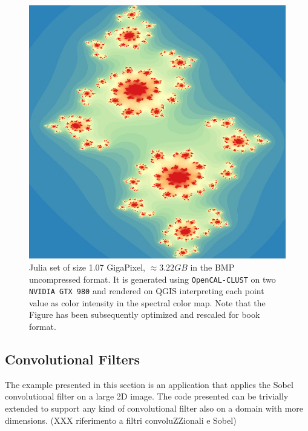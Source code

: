  \begin{figure}[H]
    \begin{center}
        \includegraphics[scale=0.35]{./images/opencal/fractal16k16k}
        \caption[Julia set of size 1.07 GigaPixel generated using \texttt{OpenCAL-CLUST}.]{Julia set of size 1.07 GigaPixel, $\approx 3.22 GB$ in the BMP uncompressed format. It is generated using \texttt{OpenCAL-CLUST} on two \texttt{NVIDIA GTX 980} and rendered on QGIS \cite{QGIS_software} interpreting each point value as color intensity in the spectral color map. Note that the Figure has been subsequently optimized and rescaled for book format.}
        \label{fig:fractal16k16k}
    \end{center}
\end{figure}

\subsection{Convolutional Filters}
\label{sec:convolutional_filters}
The example presented in this section is an application that applies the Sobel convolutional filter on a large 2D image. The code presented can be trivially extended to support any kind of convolutional filter also on a domain with more dimensions. (XXX riferimento a filtri convoluZZionali e Sobel)

